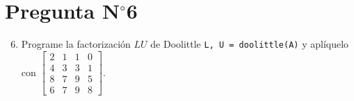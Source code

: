 \section{Pregunta N$^{\circ}$6}

\begin{frame}[fragile]

	\begin{enumerate}\setcounter{enumi}{5}
		\item

		      Programe la factorización $LU$ de Doolittle
		      \texttt{L, U = doolittle(A)} y aplíquelo
		      con
		      \begin{math}
			      \begin{bmatrix}
				      2 & 1 & 1 & 0 \\
				      4 & 3 & 3 & 1 \\
				      8 & 7 & 9 & 5 \\
				      6 & 7 & 9 & 8
			      \end{bmatrix}
		      \end{math}.
	\end{enumerate}

	\begin{solution}
		\begin{columns}
			\begin{column}{0.48\textwidth}
				\inputminted[fontsize=\tiny,firstline=1,lastline=24]{cpp}{questions/lu.cc}
			\end{column}
			\begin{column}{0.48\textwidth}
				\inputminted[fontsize=\tiny,firstline=1,lastline=23]{text}{questions/lu.txt}
			\end{column}
		\end{columns}
	\end{solution}
\end{frame}

\begin{frame}[t,fragile]
	\begin{solution}
		\begin{columns}
			\begin{column}{0.48\textwidth}
				\inputminted[fontsize=\tiny,firstline=1,lastline=35]{cpp}{questions/src/doolittle.cc}
			\end{column}
			\begin{column}{0.48\textwidth}
				\inputminted[fontsize=\tiny,firstline=1,lastline=17]{cpp}{questions/src/product.cc}

				\

				\inputminted[fontsize=\tiny,firstline=1,lastline=16]{cpp}{questions/src/print.cc}
			\end{column}
		\end{columns}
	\end{solution}
\end{frame}

